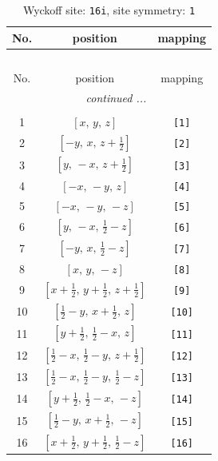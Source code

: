 \documentclass[fleqn,8pt]{jsarticle}
\begin{document}
\begin{longtable}{ccc}
\caption{Wyckoff site: {\tt 16i}, site symmetry: {\tt 1}}
 \\
 \hline \hline
No. & position & mapping \\ \hline \endfirsthead

\multicolumn{2}{l}{\tablename\ \thetable{}} \\
 \hline \hline
No. & position & mapping \\ \hline \endhead

 \hline \hline
\multicolumn{2}{r}{\footnotesize\it continued ...} \\ \endfoot

 \hline \hline
\multicolumn{2}{r}{} \\ \endlastfoot

1 & $\left[ x,\, y,\, z \right]$ & {\tt [1]} \\ \hline
2 & $\left[ - y,\, x,\, z + \frac{1}{2} \right]$ & {\tt [2]} \\ \hline
3 & $\left[ y,\, - x,\, z + \frac{1}{2} \right]$ & {\tt [3]} \\ \hline
4 & $\left[ - x,\, - y,\, z \right]$ & {\tt [4]} \\ \hline
5 & $\left[ - x,\, - y,\, - z \right]$ & {\tt [5]} \\ \hline
6 & $\left[ y,\, - x,\, \frac{1}{2} - z \right]$ & {\tt [6]} \\ \hline
7 & $\left[ - y,\, x,\, \frac{1}{2} - z \right]$ & {\tt [7]} \\ \hline
8 & $\left[ x,\, y,\, - z \right]$ & {\tt [8]} \\ \hline
9 & $\left[ x + \frac{1}{2},\, y + \frac{1}{2},\, z + \frac{1}{2} \right]$ & {\tt [9]} \\ \hline
10 & $\left[ \frac{1}{2} - y,\, x + \frac{1}{2},\, z \right]$ & {\tt [10]} \\ \hline
11 & $\left[ y + \frac{1}{2},\, \frac{1}{2} - x,\, z \right]$ & {\tt [11]} \\ \hline
12 & $\left[ \frac{1}{2} - x,\, \frac{1}{2} - y,\, z + \frac{1}{2} \right]$ & {\tt [12]} \\ \hline
13 & $\left[ \frac{1}{2} - x,\, \frac{1}{2} - y,\, \frac{1}{2} - z \right]$ & {\tt [13]} \\ \hline
14 & $\left[ y + \frac{1}{2},\, \frac{1}{2} - x,\, - z \right]$ & {\tt [14]} \\ \hline
15 & $\left[ \frac{1}{2} - y,\, x + \frac{1}{2},\, - z \right]$ & {\tt [15]} \\ \hline
16 & $\left[ x + \frac{1}{2},\, y + \frac{1}{2},\, \frac{1}{2} - z \right]$ & {\tt [16]} \\
\end{longtable}
\end{document}
